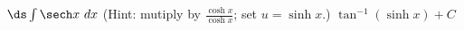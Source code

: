 {$\ds \int \sech x \ dx$ \quad(Hint: mutiply by $\frac{\cosh x}{\cosh x}$; set $u = \sinh x$.)}
{$\tan^{-1}(\sinh x)+C$}
